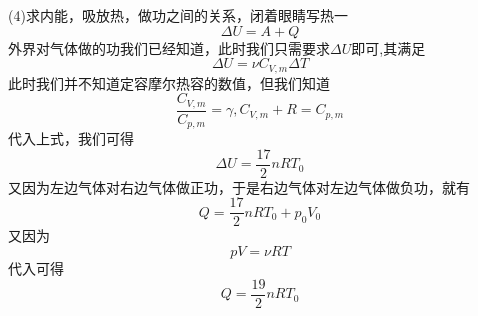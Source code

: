 \documentclass[lang=cn,10pt]{elegantbook}
\begin{document}
\begin{solution}
		(4)求内能，吸放热，做功之间的关系，闭着眼睛写热一
		\begin{equation*}
			\varDelta U=A+Q
		\end{equation*}
		外界对气体做的功我们已经知道，此时我们只需要求$\varDelta U$即可,其满足
		\begin{equation}
			\varDelta U=\nu C_{V,m}\varDelta T
		\end{equation}
		此时我们并不知道定容摩尔热容的数值，但我们知道
		\begin{equation*}
			\frac{C_{V,m}}{C_{p,m}}=\gamma,C_{V,m}+R=C_{p,m}
		\end{equation*}
		代入上式，我们可得
		\begin{equation*}
			\varDelta U=\frac{17}{2}nRT_{0}
		\end{equation*}
		又因为左边气体对右边气体做正功，于是右边气体对左边气体做负功，就有
		\begin{equation*}
			Q=\frac{17}{2}nRT_{0}+p_{0}V_{0}
		\end{equation*}
		又因为
		\begin{equation*}
			pV=\nu RT
		\end{equation*}
		代入可得
		\begin{equation*}
				Q=\frac{19}{2}nRT_{0}
		\end{equation*}
	\end{solution}
\end{document}
